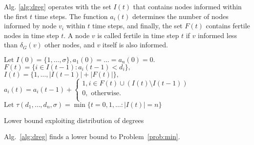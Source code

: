 Alg. \ref{alg:dreg} operates with the set $I(t)$ that contains nodes informed within the first $t$ time steps.
The function $a_i(t)$ determines the number of nodes informed by node $v_i$ within $t$ time steps, and finally,
the set $F(t)$ contains fertile nodes in time step $t$.
A node $v$ is called fertile in time step $t$ if $v$ informed less than $\delta_G(v)$ other nodes, and $v$ itself is also informed.

\begin{algorithm}
$\text{Let } I(0)=\{1,\dots,\sigma\}, a_1(0)=\dots = a_{n}(0)=0.$\\
 {
	$F(t)=\{i\in I(t-1):a_i(t-1)<d_i\},$\\
	$I(t)=\{1,\dots,|I(t-1)|+|F(t)|\},$\\
	$a_i(t)=a_i(t-1)+
	\begin{cases}
		1, i\in F(t)\cup \left(I(t)\setminus I(t-1)\right) \\
		0, \text{ otherwise. }\\
	\end{cases}$
}
$\text{Let } \tau(d_1,\dots,d_n,\sigma)=\min\{t=0,1,\dots:|I(t)|=n\}$
\caption{Lower bound exploiting distribution of degrees}
\label{alg:dreg}
\end{algorithm}


\begin{corollary}
Alg.~\ref{alg:dreg} finds a lower bound to Problem~\ref{prob:min}.
\label{cor:deg}
\end{corollary}

%
%

